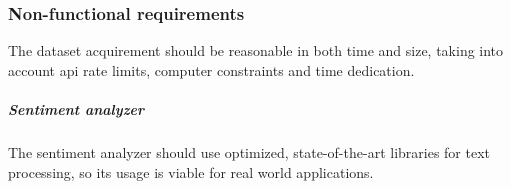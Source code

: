 \subsubsection{Non-functional requirements}

\begin{nonfunctionalmod}[DS]
    \item The dataset acquirement should be reasonable in both time and size, taking into account \acs{api} rate limits, computer constraints and time dedication.
    \setcounter{DSNF}{\value{enumi}}
\end{nonfunctionalmod}
\subparagraph{Sentiment analyzer}
\begin{nonfunctionalmod}[DS]
    \setcounter{enumi}{\value{DSNF}}
    \item The sentiment analyzer should use optimized, state-of-the-art libraries for text processing, so its usage is viable for real world applications.
\end{nonfunctionalmod}